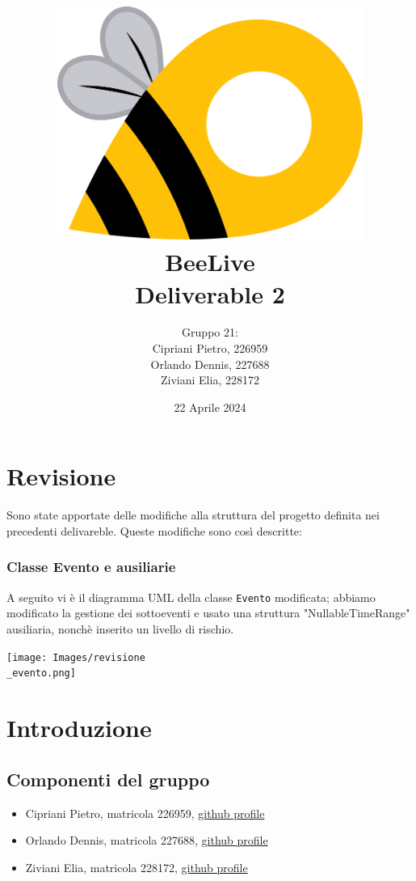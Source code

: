 \documentclass{article}
\title{\includegraphics[width=0.75\textwidth]{Images/BeeLive-Logo.png}\\\vspace{100pt}
\LARGE{\textbf{BeeLive\\Deliverable 2}}}
\author{Gruppo 21:\\
Cipriani Pietro, 226959\\
Orlando Dennis, 227688\\
Ziviani Elia, 228172}
\date{22 Aprile 2024}
\begin{document}
\maketitle
\thispagestyle{firstpage} %
\clearpage

\pagestyle{nonplain} %

\renewcommand{\contentsname}{Indice}
\tableofcontents

\clearpage

\section{Revisione}
Sono state apportate delle modifiche alla struttura del progetto definita nei precedenti delivareble. Queste modifiche sono così descritte: 

\subsubsection{Classe Evento e ausiliarie}
A seguito vi è il diagramma UML della classe \texttt{Evento} modificata; abbiamo modificato la gestione dei sottoeventi e usato una struttura "NullableTimeRange" ausiliaria, nonchè inserito un livello di rischio.\\
\begin{center}\texttt{[image: Images/revisione\\\_evento.png]}\end{center}

\section{Introduzione}

\subsection{Componenti del gruppo}
\begin{itemize}
    \item Cipriani Pietro, matricola 226959, \lbrack\href{https://github.com/pietrocipriani}{github profile}\rbrack
    \item Orlando Dennis, matricola 227688, \lbrack\href{https://github.com/dennisorlando}{github profile}\rbrack
    \item Ziviani Elia, matricola 228172, \lbrack\href{https://github.com/ELI20ZIVI}{github profile}\rbrack
\end{itemize}
\end{document}
